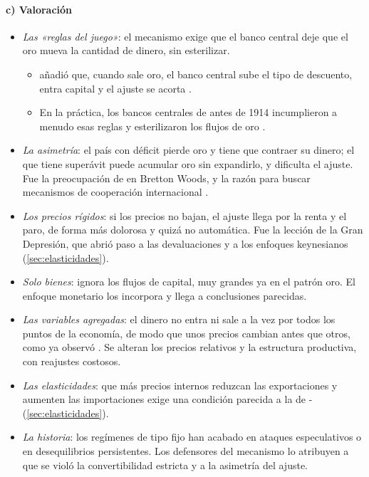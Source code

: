 \documentclass[11pt]{article}
\begin{document}
\paragraph{c) Valoración}

\begin{itemize}
\item \emph{Las «reglas del juego»}: el mecanismo exige que el banco central deje que el oro mueva la cantidad de dinero, sin esterilizar.
  \begin{itemize}
  \item {} añadió que, cuando sale oro, el banco central sube el tipo de descuento, entra capital y el ajuste se acorta .
  \item En la práctica, los bancos centrales de antes de 1914 incumplieron a menudo esas reglas y esterilizaron los flujos de oro\nocite{Bloomfield1959Monetary} .
  \end{itemize}
\item \emph{La asimetría}: el país con déficit pierde oro y tiene que contraer su dinero; el que tiene superávit puede acumular oro sin expandirlo, y dificulta el ajuste. Fue la preocupación de  en Bretton Woods, y la razón para buscar mecanismos de cooperación internacional\nocite{Keynes1943Proposals} .
\item \emph{Los precios rígidos}: si los precios no bajan, el ajuste llega por la renta y el paro, de forma más dolorosa y quizá no automática. Fue la lección de la Gran Depresión, que abrió paso a las devaluaciones y a los enfoques keynesianos (\ref{sec:elasticidades}).
\item \emph{Solo bienes}: ignora los flujos de capital, muy grandes ya en el patrón oro. El enfoque monetario los incorpora y llega a conclusiones parecidas.
\item \emph{Las variables agregadas}: el dinero no entra ni sale a la vez por todos los puntos de la economía, de modo que unos precios cambian antes que otros, como ya observó . Se alteran los precios relativos y la estructura productiva, con reajustes costosos.
\item \emph{Las elasticidades}: que más precios internos reduzcan las exportaciones y aumenten las importaciones exige una condición parecida a la de - (\ref{sec:elasticidades}).
\item \emph{La historia}: los regímenes de tipo fijo han acabado en ataques especulativos o en desequilibrios persistentes. Los defensores del mecanismo lo atribuyen a que se violó la convertibilidad estricta y a la asimetría del ajuste.
\end{itemize}
\end{document}

